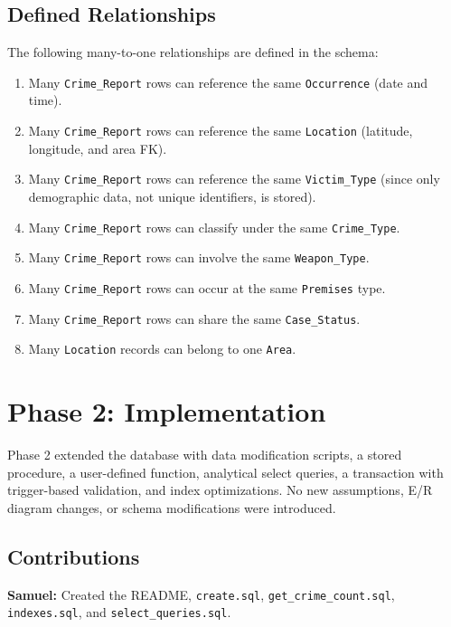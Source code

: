 \documentclass[conference]{IEEEtran}
\begin{document}
\subsection{Defined Relationships}

The following many-to-one relationships are defined in the schema:
\begin{enumerate}
    \item Many \texttt{Crime\_Report} rows can reference the same \texttt{Occurrence} (date and time).
    \item Many \texttt{Crime\_Report} rows can reference the same \texttt{Location} (latitude, longitude, and area FK).
    \item Many \texttt{Crime\_Report} rows can reference the same \texttt{Victim\_Type} (since only demographic data, not unique identifiers, is stored).
    \item Many \texttt{Crime\_Report} rows can classify under the same \texttt{Crime\_Type}.
    \item Many \texttt{Crime\_Report} rows can involve the same \texttt{Weapon\_Type}.
    \item Many \texttt{Crime\_Report} rows can occur at the same \texttt{Premises} type.
    \item Many \texttt{Crime\_Report} rows can share the same \texttt{Case\_Status}.
    \item Many \texttt{Location} records can belong to one \texttt{Area}.
\end{enumerate}

\section{Phase 2: Implementation}

Phase 2 extended the database with data modification scripts, a stored procedure, a user-defined function, analytical select queries, a transaction with trigger-based validation, and index optimizations. No new assumptions, E/R diagram changes, or schema modifications were introduced.

\subsection{Contributions}

\textbf{Samuel:} Created the README, \texttt{create.sql}, \texttt{get\_crime\_count.sql}, \texttt{indexes.sql}, and \texttt{select\_queries.sql}.
\end{document}
